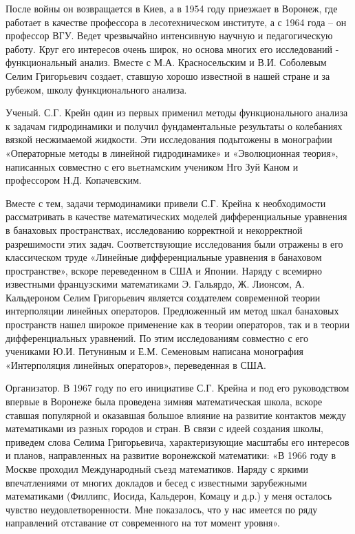 После войны он возвращается в Киев, а в 1954 году приезжает в Воронеж, где работает в качестве профессора в лесотехническом институте, а с 1964 года – он профессор ВГУ. Ведет чрезвычайно интенсивную научную и педагогическую работу. Круг его интересов очень широк, но основа многих его исследований - функциональный анализ. Вместе с М.А. Красносельским и В.И. Соболевым Селим Григорьевич создает, ставшую хорошо известной в нашей стране и за рубежом, школу функционального анализа.

Ученый. С.Г. Крейн один из первых применил методы функционального анализа к задачам гидродинамики и получил фундаментальные результаты о колебаниях вязкой несжимаемой жидкости. Эти исследования подытожены в монографии «Операторные методы в линейной гидродинамике» и «Эволюционная теория», написанных совместно с его вьетнамским учеником Нго Зуй Каном и профессором Н.Д. Копачевским.

Вместе с тем, задачи термодинамики привели С.Г. Крейна к необходимости рассматривать в качестве математических моделей дифференциальные уравнения в банаховых пространствах, исследованию корректной и некорректной разрешимости этих задач. Соответствующие исследования были отражены в его классическом труде «Линейные дифференциальные уравнения в банаховом пространстве», вскоре переведенном в США и Японии. Наряду с всемирно известными французскими математиками Э. Гальярдо, Ж. Лионсом, А. Кальдероном Селим Григорьевич является создателем современной теории интерполяции линейных операторов. Предложенный им метод шкал банаховых пространств нашел широкое применение как в теории операторов, так и в теории дифференциальных уравнений. По этим исследованиям совместно с его учениками Ю.И. Петуниным и Е.М. Семеновым написана монография «Интерполяция линейных операторов», переведенная в США.

Организатор. В 1967 году по его инициативе С.Г. Крейна и под его руководством впервые в Воронеже была проведена зимняя математическая школа, вскоре ставшая популярной и оказавшая большое влияние на развитие контактов между математиками из разных городов и стран. В связи с идеей создания школы, приведем слова Селима Григорьевича, характеризующие масштабы его интересов и планов, направленных на развитие воронежской математики: «В 1966 году в Москве проходил Международный съезд математиков. Наряду с яркими впечатлениями от многих докладов и бесед с известными зарубежными математиками (Филлипс, Иосида, Кальдерон, Комацу и д.р.) у меня осталось чувство неудовлетворенности. Мне показалось, что у нас имеется по ряду направлений отставание от современного на тот момент уровня».

